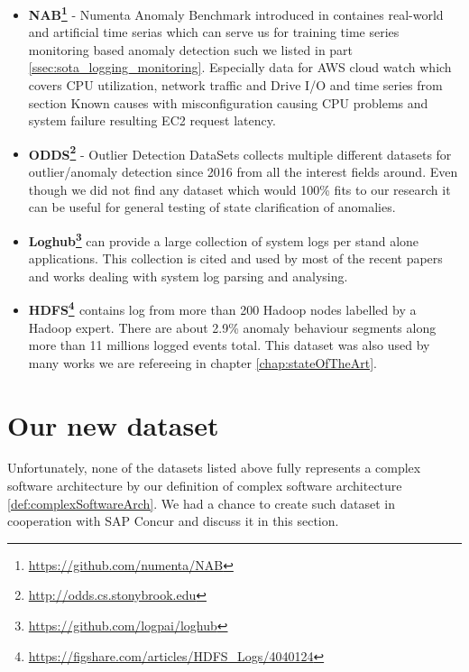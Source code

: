 \begin{itemize}

    \item \textbf{NAB\footnote{\url{https://github.com/numenta/NAB}}} - Numenta Anomaly Benchmark introduced in \cite{ahmad2017unsupervised} containes real-world and artificial time serias which can serve us for training time series monitoring based anomaly detection such we listed in part \ref{ssec:sota_logging_monitoring}. Especially data for AWS cloud watch which covers CPU utilization, network traffic and Drive I/O and time series from section Known causes with misconfiguration causing CPU problems and system failure resulting EC2 request latency.
    
    \item \textbf{ODDS\footnote{\url{http://odds.cs.stonybrook.edu}}} - Outlier Detection DataSets collects multiple different datasets for outlier/anomaly detection since 2016 from all the interest fields around. Even though we did not find any dataset which would 100\% fits to our research it can be useful for general testing of state clarification of anomalies. 
    
    \item \textbf{Loghub\footnote{\url{https://github.com/logpai/loghub}}} can provide a large collection of system logs per stand alone applications. This collection is cited and used by most of the recent papers and works dealing with system log parsing and analysing.

   \item \textbf{HDFS\footnote{\url{https://figshare.com/articles/HDFS_Logs/4040124}} \cite{xu2009detecting,xu2009online,Zhu2017}} contains log from more than 200 Hadoop nodes labelled by a Hadoop expert. There are about 2.9\% anomaly behaviour segments along more than 11 millions logged events total. This dataset was also used by many works we are refereeing in chapter \ref{chap:stateOfTheArt}.
    
\end{itemize}

\section{Our new dataset}

Unfortunately, none of the datasets listed above fully represents a complex software architecture by our definition of complex software architecture \ref{def:complexSoftwareArch}. We had a chance to create such dataset in cooperation with SAP Concur and discuss it in this section.

